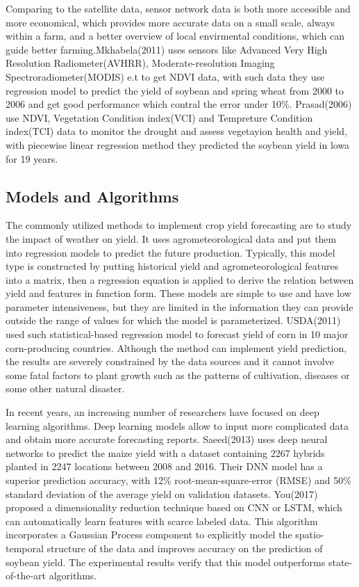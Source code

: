 \documentclass[conference]{IEEEtran}
\begin{document}
    Comparing to the satellite data, sensor network data is both more accessible and more economical, which provides more accurate data on a small scale, always within a farm, and a better overview of local envirmental conditions, which can guide better farming.Mkhabela(2011)\cite{Mkhabela2011} uses sensors like Advanced Very High Resolution Radiometer(AVHRR), Moderate-resolution Imaging Spectroradiometer(MODIS) e.t to get NDVI data, with such data they use regression model to predict the yield of soybean and spring wheat from 2000 to 2006 and get good performance which contral the error under 10\%. Prasad(2006)\cite{Prasad2006} use NDVI, Vegetation Condition index(VCI) and Tempreture Condition index(TCI) data to monitor the drought and assess vegetayion health and yield, with piecewise linear regression method they predicted the soybean yield in lowa for 19 years.

  \subsection{Models and Algorithms}

    The commonly utilized methods to implement crop yield forecasting are to study the impact of weather on yield. It uses agrometeorological data and put them into regression models to predict the future production. Typically, this model type is constructed by putting historical yield and agrometeorological features into a matrix, then a regression equation is applied to derive the relation between yield and features in function form. These models are simple to use and have low parameter intensiveness, but they are limited in the information they can provide outside the range of values for which the model is parameterized. USDA(2011)\cite{good2011usda} used such statistical-based regression model to forecast yield of corn in 10 major corn-producing countries. Although the method can implement yield prediction, the results are severely constrained by the data sources and it cannot involve some fatal factors to plant growth such as the patterns of cultivation, diseases or some other natural disaster. 

    In recent years, an increasing number of researchers have focused on deep learning algorithms. Deep learning models allow to input more complicated data and obtain more accurate forecasting reports. Saeed(2013)\cite{Basso2013} uses deep neural networks to predict the maize yield with a dataset containing 2267 hybrids planted in 2247 locations between 2008 and 2016. Their DNN model has a superior prediction accuracy, with 12\% root-mean-square-error (RMSE) and 50\% standard deviation of the average yield on validation datasets. You(2017)\cite{You2017} proposed a dimensionality reduction technique based on CNN or LSTM, which can automatically learn features with scarce labeled data. This algorithm incorporates a Gaussian Process component to explicitly model the spatio-temporal structure of the data and improves accuracy on the prediction of soybean yield. The experimental results verify that this model outperforms state-of-the-art algorithms.
\end{document}
